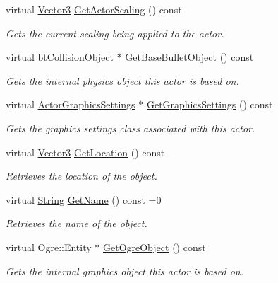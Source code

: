 \begin{DoxyCompactItemize}
virtual \hyperlink{classphys_1_1Vector3}{Vector3} \hyperlink{classphys_1_1ActorBase_a025491d083a18471628a9b57339dd17c}{GetActorScaling} () const 
\begin{DoxyCompactList}\small\item\em Gets the current scaling being applied to the actor. \item\end{DoxyCompactList}\item 
virtual btCollisionObject $\ast$ \hyperlink{classphys_1_1ActorBase_abc72866a25bcff3b73a1d61c9acb2f76}{GetBaseBulletObject} () const 
\begin{DoxyCompactList}\small\item\em Gets the internal physics object this actor is based on. \item\end{DoxyCompactList}\item 
virtual \hyperlink{classphys_1_1ActorGraphicsSettings}{ActorGraphicsSettings} $\ast$ \hyperlink{classphys_1_1ActorBase_a90cdbb9e0d01e9ab0cbac24ff8891e1c}{GetGraphicsSettings} () const 
\begin{DoxyCompactList}\small\item\em Gets the graphics settings class associated with this actor. \item\end{DoxyCompactList}\item 
virtual \hyperlink{classphys_1_1Vector3}{Vector3} \hyperlink{classphys_1_1ActorBase_a777b4ea4d6881af76c646b1ba9324d96}{GetLocation} () const 
\begin{DoxyCompactList}\small\item\em Retrieves the location of the object. \item\end{DoxyCompactList}\item 
virtual \hyperlink{namespacephys_aa03900411993de7fbfec4789bc1d392e}{String} \hyperlink{classphys_1_1ActorBase_a1a7a7bc80bf30f142e92f4d29842d274}{GetName} () const =0
\begin{DoxyCompactList}\small\item\em Retrieves the name of the object. \item\end{DoxyCompactList}\item 
virtual Ogre::Entity $\ast$ \hyperlink{classphys_1_1ActorBase_ad91615975e0dd7b2aaac8fa002686ef2}{GetOgreObject} () const 
\begin{DoxyCompactList}\small\item\em Gets the internal graphics object this actor is based on. \item\end{DoxyCompactList}\item 

\end{DoxyCompactItemize}
